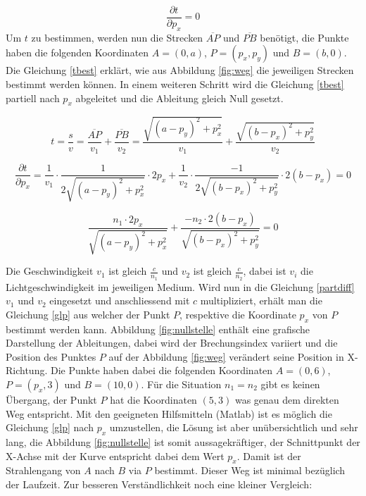 \begin{refsection}
\begin{equation}\label{bedmin}
\dfrac{\partial t}{\partial p_{x}}=0
\end{equation}
Um $t$ zu bestimmen, werden nun die Strecken $\overline{AP}$ und $\overline{PB}$ benötigt, die Punkte haben die folgenden Koordinaten $A = (0,a)$, $P=(p_{x},p_{y})$ und $B=(b,0)$. Die Gleichung \eqref{tbest} erklärt, wie aus Abbildung \ref{fig:weg} die jeweiligen Strecken bestimmt werden können. In einem weiteren Schritt wird die Gleichung \eqref{tbest} partiell nach $p_{x}$ abgeleitet und die Ableitung gleich Null gesetzt.

\begin{equation}\label{tbest}
t=\dfrac{s}{v}=\dfrac{\overline{AP}}{v_{1}}+\dfrac{\overline{PB}}{v_{2}}= 
\dfrac{\sqrt{(a-p_{y})^{2}+p_{x}^{2}}}{v_{1}}+ 
\dfrac{\sqrt{(b-p_{x})^{2}+p_{y}^{2}}}{v_{2}}
\end{equation}

\begin{equation}\label{partdiff}
\dfrac{\partial t}{\partial p_{x}}=
\dfrac{1}{v_{1}}\cdot \dfrac{1}{2 \sqrt{(a-p_{y})^{2}+p_{x}^{2}}}\cdot 2p_{x} +
\dfrac{1}{v_{2}}\cdot \dfrac{-1}{2 \sqrt{(b-p_{x})^{2}+p_{y}^{2}}}\cdot 2(b-p_{x})= 0
\end{equation}

\begin{equation}\label{glp}
\dfrac{n_{1}\cdot 2p_{x} }{\sqrt{(a-p_{y})^{2}+p_{x}^{2}}}+
\dfrac{-n_{2}\cdot 2(b-p_{x})}{\sqrt{(b-p_{x})^{2}+p_{y}^{2}}}= 0
\end{equation}

Die Geschwindigkeit $ v_{1}$ ist gleich $\frac{c}{n_{1}} $ und $ v_{2}$ ist gleich $\frac{c}{n_{2}}$, dabei ist $v_{i}$ die Lichtgeschwindigkeit im jeweiligen Medium. Wird nun in die Gleichung \eqref{partdiff} $ v_{1}$ und $ v_{2}$ eingesetzt und anschliessend mit $c$ multipliziert, erhält man die Gleichung \eqref{glp} aus welcher der Punkt $P$, respektive die Koordinate $p_{x}$ von $P$ bestimmt werden kann.
Abbildung \ref{fig:nullstelle} enthält eine grafische Darstellung der Ableitungen, dabei wird der Brechungsindex variiert und die Position des Punktes $P$ auf der Abbildung \ref{fig:weg} verändert seine Position in X-Richtung. Die  Punkte haben dabei die folgenden Koordinaten $A = (0,6)$, $P=(p_{x},3)$ und $B=(10,0)$. Für die Situation $n_{1}=n_{2}$ gibt es keinen Übergang, der Punkt $P$ hat die Koordinaten $(5,3)$ was genau dem direkten Weg entspricht. Mit den geeigneten Hilfsmitteln (Matlab) ist es möglich die Gleichung \eqref{glp} nach $p_{x}$ umzustellen, die Lösung ist aber unübersichtlich und sehr lang, die Abbildung \ref{fig:nullstelle} ist somit aussagekräftiger, der Schnittpunkt der X-Achse mit der Kurve entspricht dabei dem Wert $p_{x}$.
Damit ist der Strahlengang von $A$ nach $B$ via $P$ bestimmt. Dieser Weg ist minimal bezüglich der Laufzeit. \newline
Zur besseren Verständlichkeit noch eine kleiner Vergleich:


\end{refsection}
